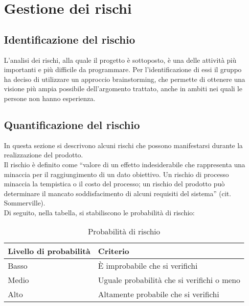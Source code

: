 
\section{Gestione dei rischi}{
	
	\subsection{Identificazione del rischio}{
	L'analisi dei rischi, alla quale il progetto è sottoposto, è una delle attività più importanti e più difficile da programmare. Per l'identificazione di essi il gruppo ha deciso di utilizzare  un approccio brainstorming\g, che permette di ottenere una visione più ampia possibile dell'argomento trattato, anche in ambiti nei quali le persone non hanno esperienza. 
	}
	
	\subsection{Quantificazione del rischio}{
		In questa sezione si descrivono alcuni rischi che possono manifestarsi durante la realizzazione del prodotto.\\ Il rischio è definito come ``valore di un effetto indesiderabile che rappresenta una minaccia per il raggiungimento di un dato obiettivo. Un rischio di processo minaccia la tempistica o il costo del processo; un rischio del prodotto può determinare il mancato soddisfacimento di alcuni requisiti del sistema'' (cit. Sommerville).\\
	Di seguito, nella tabella, si stabiliscono le probabilità di rischio:	
	\begin{table}[h]
		\begin{center}
			\begin{tabular}{l l }				
				\toprule
				Livello di probabilità	&	Criterio	 \\ \hline
				Basso& \`E improbabile che  si verifichi \\
				Medio& Uguale probabilità che si verifichi o meno \\
				Alto&  Altamente probabile che si verifichi\\
				\bottomrule
			\end{tabular}
		\end{center}

	\caption{Probabilità di rischio}
	\end{table}
	}
	
}
